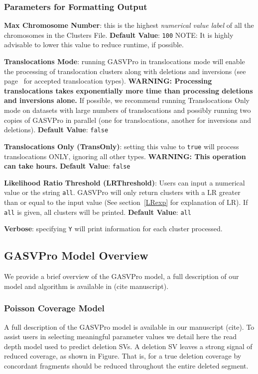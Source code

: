 \documentclass[11pt]{article}
\begin{document}
\subsubsection{Parameters for Formatting Output}
\begin{description}
\item{\bf Max Chromosome Number}:  this is the highest {\em numerical value label} of all the chromosomes in the Clusters File. {\bf Default Value}: \verb+100+ {\scriptsize NOTE: It is highly advisable to lower this value to reduce runtime, if possible.}
\item {\bf Translocations Mode}: running GASVPro in translocations mode will enable the processing of translocation clusters along with deletions and inversions (see page~\pageref{structvartypes} for accepted translocation types). {\bf WARNING: Processing translocations takes exponentially more time than processing deletions and inversions alone.} If possible, we recommend running Translocations Only mode on datasets with large numbers of translocations and possibly running two copies of GASVPro in parallel (one for translocations, another for inversions and deletions). {\bf Default Value}: \verb+false+

\item {\bf Translocations Only (TransOnly)}: setting this value to \verb+true+ will process translocations ONLY, ignoring all other types. {\bf WARNING: This operation can take hours.} {\bf Default Value}: \verb+false+
\item {\bf Likelihood Ratio Threshold (LRThreshold)}: Users can input a numerical value or the string \verb+all+. GASVPro will only return clusters with a LR greater than or equal to the input value (See section~\ref{LRexp} for explanation of LR). If \verb+all+ is given, all clusters will be printed. {\bf Default Value}: \verb+all+
\item {\bf Verbose}: specifying \verb+Y+ will print information for each cluster processed. 
\end{description}

\subsection{GASVPro Model Overview}
\label{sec:modeloverview}

We provide a brief overview of the GASVPro model, a full description of our model and algorithm is available in (cite manuscript).

\subsubsection{Poisson Coverage Model}
 A full description of the GASVPro model is available in our manuscript (cite). To assist users in selecting meaningful parameter values we detail here the read depth model used to predict deletion SVs.  A deletion SV leaves a strong signal of reduced coverage, as shown in Figure. That is, for a true deletion coverage by concordant fragments should be reduced throughout the entire deleted segment. 
 
\end{document}
